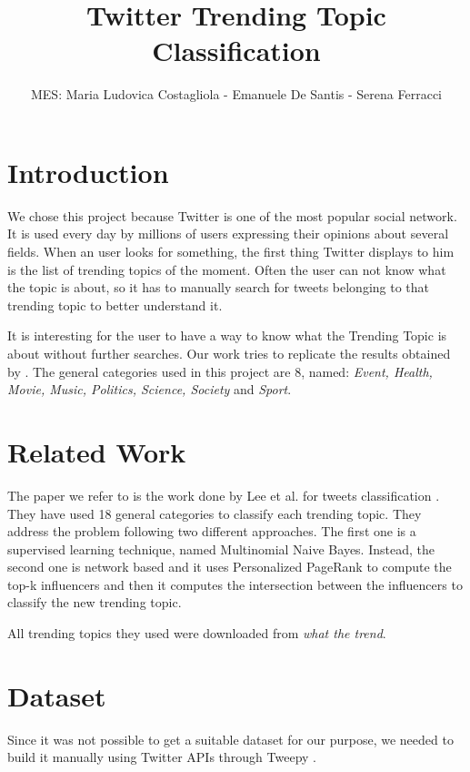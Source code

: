 \documentclass[journal,11pt]{vgtc}
\title{Twitter Trending Topic Classification}
\author{MES: Maria Ludovica Costagliola - Emanuele De Santis - Serena Ferracci}
\begin{document}
\maketitle

\section{Introduction}
We chose this project because Twitter is one of the most popular social network.
It is used every day by millions of users expressing their opinions about several fields.
When an user looks for something, the first thing Twitter displays to him is the list of
trending topics of the moment. Often the user can not know what the topic is about, so it has to manually
search for tweets belonging to that trending topic to better understand it.

It is interesting for the user to have a way to know what the Trending Topic is about
without further searches.
Our work tries to replicate the results obtained by \cite{lee_palsetia_narayanan_patwary_agrawal_choudhary_2011}.
The general categories used in this project are 8, named: \textit{Event, Health, Movie, Music, Politics, Science, Society} and \textit{Sport}.


\section{Related Work}
The paper we refer to is the work done by Lee et al. for tweets classification \cite{lee_palsetia_narayanan_patwary_agrawal_choudhary_2011}.
They have used 18 general categories to classify each trending topic.
They address the problem following two different approaches. The first one is a supervised learning technique, named
Multinomial Naive Bayes. Instead, the second one is network based and it uses Personalized PageRank to compute the
top-k influencers and then it computes the intersection between the influencers to classify the new trending topic.

All trending topics they used were downloaded from \textit{what the trend}.

\section{Dataset}
Since it was not possible to get a suitable dataset for our purpose, we needed to build it manually
using Twitter APIs \cite{twitter} through Tweepy \cite{api}.
\end{document}

